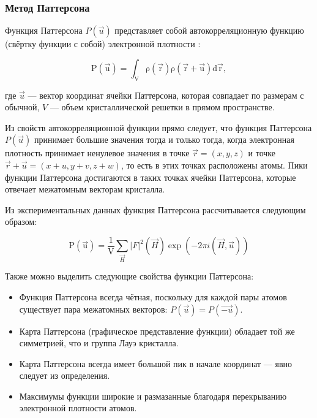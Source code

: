 \subsubsection{Метод Паттерсона}

Функция Паттерсона $P(\overrightarrow{u})$ представляет собой автокорреляционную функцию (свёртку функции с собой) электронной плотности \cite{girolami_x-ray_2016}:

\begin{equation}
	\mathrm{P(\overrightarrow{u}) = \int_V \rho(\overrightarrow{r})\rho(\overrightarrow{r}+\overrightarrow{u})d\overrightarrow{r}},
\end{equation}

где $\overrightarrow{u}$ --- вектор координат ячейки Паттерсона, которая совпадает по размерам с обычной, $V$ --- объем кристаллической решетки в прямом пространстве.

Из свойств автокорреляционной функции прямо следует, что функция Паттерсона $P(\overrightarrow{u})$ принимает большие значения тогда и только тогда, когда электронная плотность принимает ненулевое значения в точке $\overrightarrow{r} = (x,y,z)$ и точке $\overrightarrow{r}+\overrightarrow{u} = (x+u, y+v, z+w)$, то есть в этих точках расположены атомы. Пики функции Паттерсона достигаются в таких точках ячейки Паттерсона, которые отвечает межатомным векторам кристалла.

Из экспериментальных данных функция Паттерсона рассчитывается следующим образом:

\begin{equation}\label{patt_start}
	\mathrm{P(\overrightarrow{u})=\frac{1}{V}}\sum_{\overrightarrow{H}}|F|^2(\overrightarrow{H})\exp(-2\pi i (\overrightarrow{H}, \overrightarrow{u}))
\end{equation}


Также можно выделить следующие свойства функции Паттерсона:

\begin{itemize}
	\item Функция Паттерсона всегда чётная, поскольку для каждой пары атомов существует пара межатомных векторов: $P(\overrightarrow{u}) = P(\overrightarrow{-u})$.
	\item Карта Паттерсона (графическое представление функции) обладает той же симметрией, что и группа Лауэ кристалла.
	\item Карта Паттерсона всегда имеет большой пик в начале координат --- явно следует из определения.
	\item Максимумы функции широкие и размазанные благодаря перекрыванию электронной плотности атомов.
\end{itemize}

